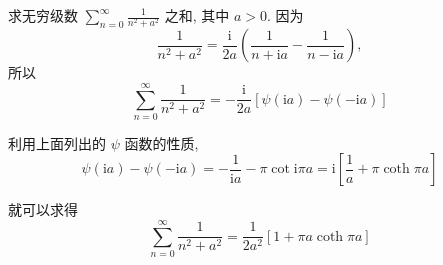 \begin{examplebox}{求无穷级数 $\sum_{n=0}^{\infty} \frac{1}{n^{2}+a^{2}}$ 之和, 其中 $a>0$.}
因为
$$
\frac{1}{n^{2}+a^{2}}=\frac{\mathrm{i}}{2 a}\left(\frac{1}{n+\mathrm{i} a}-\frac{1}{n-\mathrm{i} a}\right),
$$
所以
$$
\sum_{n=0}^{\infty} \frac{1}{n^{2}+a^{2}}=-\frac{\mathrm{i}}{2 a}[\psi(\mathrm{i} a)-\psi(-\mathrm{i} a)]
$$

利用上面列出的 $\psi$ 函数的性质,
$$
\psi(\mathrm{i} a)-\psi(-\mathrm{i} a)=-\frac{1}{\mathrm{i} a}-\pi \cot \mathrm{i} \pi a=\mathrm{i}\left[\frac{1}{a}+\pi \operatorname{coth} \pi a\right]
$$

就可以求得
$$
\sum_{n=0}^{\infty} \frac{1}{n^{2}+a^{2}}=\frac{1}{2 a^{2}}[1+\pi a \operatorname{coth} \pi a]
$$
\end{examplebox}